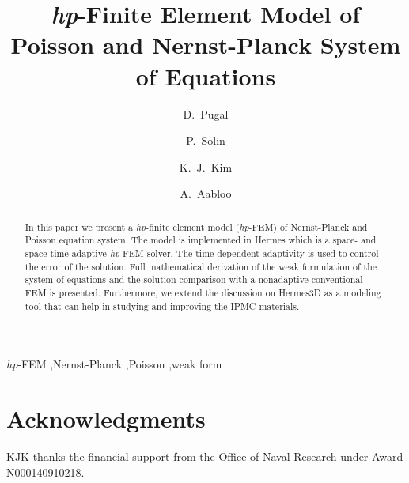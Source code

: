 \documentclass[letterpaper,3p]{elsarticle}
\begin{document}
\begin{frontmatter}

\title{\emph{hp}-Finite Element Model of Poisson and Nernst-Planck System of Equations}

\author[unrme,tartu]{D.~Pugal}

\author[unrmath,czech]{P.~Solin}

\author[unrme]{K.~J.~Kim}

\author[tartu]{A.~Aabloo}

\address[unrme]{Mechanical Engineering Department, University of Nevada, Reno, NV, U.S.A.}
\address[unrmath]{FEM group, Department of Mathematics and Statistics,\\
University of Nevada, Reno, NV, U.S.A.}
\address[czech]{Institute of Thermomechanics, Prague, Czech Republic}
\address[tartu]{Institute of Technology, Tartu University, Estonia}


\begin{abstract}
 In this paper we present a \emph{hp}-finite element
model (\emph{hp}-FEM) of Nernst-Planck and Poisson equation system.
The model is implemented in Hermes which is a
space- and space-time adaptive \emph{hp}-FEM solver. The time dependent
adaptivity is used to control the error of the solution. Full mathematical
derivation of the weak formulation of the system of equations and
the solution comparison with a nonadaptive conventional FEM is presented.
Furthermore, we extend the discussion on Hermes3D as a modeling tool that can
help in studying and improving the IPMC materials.
\end{abstract}

\begin{keyword}
  \emph{hp}-FEM \sep Nernst-Planck \sep Poisson \sep weak form
\end{keyword}

\end{frontmatter}







\section*{Acknowledgments}
KJK thanks the financial support from the Office of Naval Research under Award N000140910218.


\end{document}
